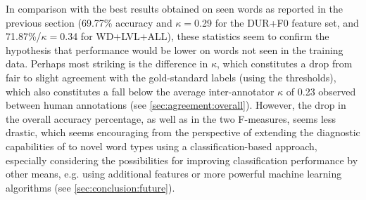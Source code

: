 	
	In comparison with the best results obtained on seen words as reported in the previous section 
	(69.77\% accuracy and $\kappa=$0.29 for the DUR+F0 feature set, and 71.87\%/$\kappa=$0.34 for WD+LVL+ALL),
	 these statistics seem to confirm the hypothesis that performance would be lower on words not seen in the training data. Perhaps most striking is the difference in $\kappa$, which constitutes a drop from fair to slight agreement with the gold-standard labels (using the \textcite{Landis1977} thresholds), which also constitutes a fall below the average inter-annotator $\kappa$ of 0.23 observed between human annotations (see \cref{sec:agreement:overall}). However, the drop in the overall accuracy percentage, as well as in the two F-measures, seems less drastic, which seems encouraging from the perspective of extending the diagnostic capabilities of  to novel word types using a classification-based approach, especially considering the possibilities for improving classification performance by other means, e.g. using additional features or more powerful machine learning algorithms (see \cref{sec:conclusion:future}).
	
	
		
		
	

	
	

		
		

	
	






	
	
	
	 
